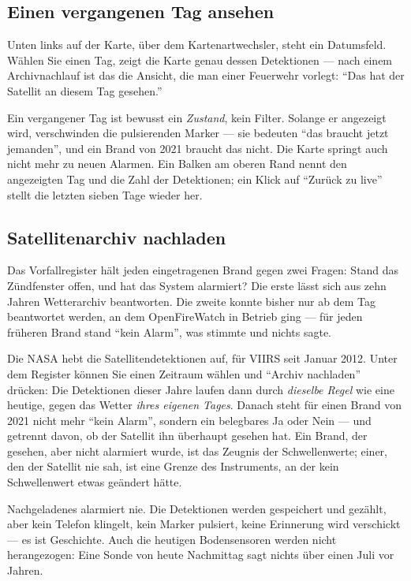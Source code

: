 \documentclass[11pt,a4paper,DIV=12,parskip=half]{scrartcl}
\begin{document}
\subsection{Einen vergangenen Tag ansehen}\label{sec:zeitreise}

Unten links auf der Karte, über dem Kartenartwechsler, steht ein Datumsfeld.
Wählen Sie einen Tag, zeigt die Karte genau dessen Detektionen --- nach einem
Archivnachlauf ist das die Ansicht, die man einer Feuerwehr vorlegt:
\enquote{Das hat der Satellit an diesem Tag gesehen.}

Ein vergangener Tag ist bewusst ein \emph{Zustand}, kein Filter. Solange er
angezeigt wird, verschwinden die pulsierenden Marker --- sie bedeuten
\enquote{das braucht jetzt jemanden}, und ein Brand von 2021 braucht das
nicht. Die Karte springt auch nicht mehr zu neuen Alarmen. Ein Balken am
oberen Rand nennt den angezeigten Tag und die Zahl der Detektionen; ein Klick
auf \enquote{Zurück zu live} stellt die letzten sieben Tage wieder her.

\subsection{Satellitenarchiv nachladen}\label{sec:archiv}

Das Vorfallregister hält jeden eingetragenen Brand gegen zwei Fragen: Stand
das Zündfenster offen, und hat das System alarmiert? Die erste lässt sich aus
zehn Jahren Wetterarchiv beantworten. Die zweite konnte bisher nur ab dem Tag
beantwortet werden, an dem OpenFireWatch in Betrieb ging --- für jeden
früheren Brand stand \enquote{kein Alarm}, was stimmte und nichts sagte.

Die NASA hebt die Satellitendetektionen auf, für VIIRS seit Januar 2012. Unter
dem Register können Sie einen Zeitraum wählen und \enquote{Archiv nachladen}
drücken: Die Detektionen dieser Jahre laufen dann durch \emph{dieselbe Regel}
wie eine heutige, gegen das Wetter \emph{ihres eigenen Tages}. Danach steht
für einen Brand von 2021 nicht mehr \enquote{kein Alarm}, sondern ein
belegbares Ja oder Nein --- und getrennt davon, ob der Satellit ihn überhaupt
gesehen hat. Ein Brand, der gesehen, aber nicht alarmiert wurde, ist das
Zeugnis der Schwellenwerte; einer, den der Satellit nie sah, ist eine Grenze
des Instruments, an der kein Schwellenwert etwas geändert hätte.

\begin{hinweis}
Nachgeladenes alarmiert nie. Die Detektionen werden gespeichert und gezählt,
aber kein Telefon klingelt, kein Marker pulsiert, keine Erinnerung wird
verschickt --- es ist Geschichte. Auch die heutigen Bodensensoren werden nicht
herangezogen: Eine Sonde von heute Nachmittag sagt nichts über einen Juli vor
Jahren.
\end{hinweis}
\end{document}
